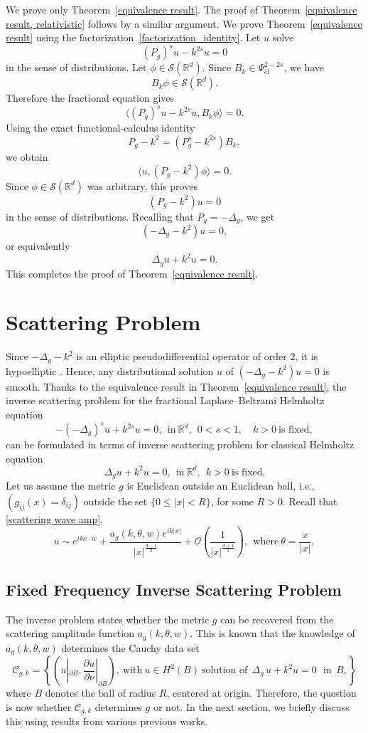 \documentclass[12pt]{amsart}
\numberwithin{equation}{section}
\theoremstyle{definition}
\theoremstyle{remark}
\numberwithin{equation}{section}
\newcommand{\R}{{\mathbb R}}
\begin{document}
	We prove only Theorem~\ref{equivalence result}. The proof of Theorem~\ref{equivalence result, relativistic} follows by a similar argument. We prove Theorem~\ref{equivalence result} using the factorization~\eqref{factorization_identity}. Let $u$ solve
	\[
	(P_g)^s u-k^{2s}u=0
	\]
	in the sense of distributions. Let $\phi\in\mathcal{S}(\mathbb{R}^d)$. Since
	$B_k\in\Psi^{2-2s}_{\mathrm{cl}}$, we have \cite{Hormander1985, Taylor1991}
	\[
	B_k\phi\in\mathcal{S}(\mathbb{R}^d).
	\]
	Therefore the fractional equation gives
	\[
	\big\langle (P_g)^s u-k^{2s}u, B_k\phi\big\rangle=0.
	\]
	Using the exact functional-calculus identity
	\[
	P_g-k^2=(P_g^s-k^{2s})B_k,
	\]
	we obtain
	\[
	\big\langle u,(P_g-k^2)\phi\big\rangle=0.
	\]
	Since $\phi\in\mathcal{S}(\mathbb{R}^d)$ was arbitrary, this proves
	\[
	(P_g-k^2)u=0
	\]
	in the sense of distributions. Recalling that $P_g=-\Delta_g$, we get
	\[
	(-\Delta_g-k^2)u=0,
	\]
	or equivalently
	\[
	\Delta_g u+k^2u=0.
	\]
	This completes the proof of Theorem~\ref{equivalence result}.
	
	
	
	
	
	
	
	
	\section{ Scattering Problem}
	Since $-\Delta_g-k^2$ is an elliptic pseudodifferential operator of order $2$, it is hypoelliptic \cite{Hormander1985, Taylor1991}. Hence, any distributional solution $u$ of
	$(-\Delta_g-k^2)u=0$ is smooth.
	Thanks to the equivalence result in Theorem~\ref{equivalence result}, the inverse scattering problem for the fractional Laplace--Beltrami Helmholtz equation 
	\[
	-(-\Delta_g)^s u+k^{2s}u=0, \ \ \text{in}\ \R^d, \ \ 0<s<1,\quad k>0 \ \text{is fixed},
	\]
	can be formulated in terms of inverse scattering problem for classical Helmholtz equation
	\[
	\Delta_g u +k^2u =0, \ \ \text{in}\ \R^d, \ \ k>0 \ \text{is fixed}.
	\]
	Let us assume the metric $g$ is Euclidean outside an Euclidean ball, i.e., $(g_{ij}(x)=\delta_{ij})$ outside the set $\{0\leq |x|< R\}$, for some $R>0$. Recall that  \eqref{scattering wave amp},
	\[
	u\sim e^{ikx\cdot w}+ \frac{a_g(k,\theta,w)e^{ik|x|}}{|x|^{\frac{d-1}{2}}}+\mathcal{O}\left(\frac{1}{|x|^{\frac{d+1}{2}}}\right), \ \ \text{where} \ \theta=\frac{x}{|x|},
	\]
	\subsection{Fixed Frequency Inverse Scattering Problem}
	The inverse problem states whether the metric $g$ can be recovered from the scattering amplitude function $a_g(k,\theta,w)$. This is known that the knowledge of $a_g(k,\theta,w)$ determines the Cauchy data set \cite{uhlmann1992inverse}
	\[
	\mathcal{C}_{g,k}=\left\{ \left(u|_{\partial B}, \frac{\partial u}{\partial \nu}|_{\partial B}\right), \ \text{with}\ u\in H^2(B) \ \text{solution of}\ \ \Delta_g \,u+k^2u=0 \ \ \ \mbox{in}\ \ B,\right\}
	\]
	where $B$ denotes the ball of radius $R$, centered at origin. Therefore, the question is now whether $\mathcal{C}_{g,k}$ determines $g$ or not. In the next section, we briefly discuss this using results from various previous works.
	
\end{document}

